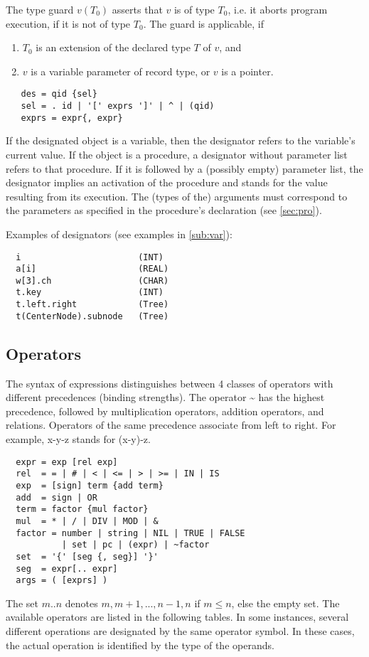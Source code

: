 The type guard $v(T_0)$ asserts that $v$ is of type $T_0$, i.e. it aborts program execution,
if it is not of type $T_0$. The guard is applicable, if
\begin{enumerate}
  \item $T_0$ is an extension of the declared type $T$ of $v$, and
  \item $v$ is a variable parameter of record type, or $v$ is a pointer.
\end{enumerate}
\begin{verbatim}
   des = qid {sel}
   sel = . id | '[' exprs ']' | ^ | (qid)
   exprs = expr{, expr}
\end{verbatim}
If the designated object is a variable, then the designator refers to the variable's
current value. If the object is a procedure, a designator without parameter list refers to
that procedure. If it is followed by a (possibly empty) parameter list, the designator
implies an activation of the procedure and stands for the value resulting from its execution.
The (types of the) arguments must correspond to the parameters as specified
in the procedure's declaration (see \ref{sec:pro}).

Examples of designators (see examples in \ref{sub:var}):
\begin{verbatim}
  i                       (INT)
  a[i]                    (REAL)
  w[3].ch                 (CHAR)
  t.key                   (INT)
  t.left.right            (Tree)
  t(CenterNode).subnode   (Tree)
\end{verbatim}

\subsection{Operators}
\label{sub:op}
The syntax of expressions distinguishes between 4 classes of operators with different precedences
(binding strengths). The operator \~{} has the highest precedence, followed by multiplication
operators, addition operators, and relations. Operators of the same precedence associate from
left to right. For example, x-y-z stands for (x-y)-z.
\begin{verbatim}
  expr = exp [rel exp]
  rel  = = | # | < | <= | > | >= | IN | IS
  exp  = [sign] term {add term}
  add  = sign | OR
  term = factor {mul factor}
  mul  = * | / | DIV | MOD | &
  factor = number | string | NIL | TRUE | FALSE
           | set | pc | (expr) | ~factor
  set  = '{' [seg {, seg}] '}'
  seg  = expr[.. expr]
  args = ( [exprs] )
\end{verbatim}
The set ${m..n}$ denotes ${m, m+1, ... , n-1, n}$ if $m \le n$, else the empty set. The
available operators are listed in the following tables. In some instances, several different
operations are designated by the same operator symbol. In these cases, the actual operation
is identified by the type of the operands.

